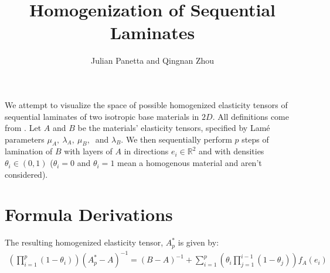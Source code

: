 \documentclass[10pt]{article}
\title{Homogenization of Sequential Laminates}
\author{Julian Panetta and Qingnan Zhou}
\begin{document}
\setlength{\droptitle}{-50pt}
\maketitle

We attempt to visualize the space of possible homogenized elasticity tensors of
sequential laminates of two isotropic base materials in $2D$. All definitions
come from \cite{allaire2002shape}. Let $A$ and $B$ be the materials' elasticity
tensors, specified by Lam\'e parameters $\mu_A,\ \lambda_A,\ \mu_B,\ $ and
$\lambda_B$. We then sequentially perform $p$ steps of lamination of $B$ with
layers of $A$ in directions $e_i \in \mathbb{R}^2$ and with densities $\theta_i \in
(0, 1)$ ($\theta_i = 0$ and $\theta_i = 1$ mean a homogenous material and aren't
considered).

\section{Formula Derivations}
The resulting homogenized elasticity tensor, $A^*_p$ is given by:
\begin{align}
\label{eqn:Astar}
\left(\prod_{i=1}^p (1 - \theta_i) \right)\left(A^*_p - A\right)^{-1} =
\left(B - A\right)^{-1} + \sum_{i = 1}^p
\left( \theta_i \prod_{j = 1}^{i - 1} (1 - \theta_j)\right) f_A(e_i)
\end{align}
\end{document}

